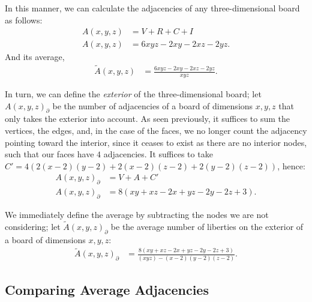 In this manner, we can calculate the adjacencies of any three-dimensional board as follows:
\begin{align*}
	A(x,y,z)&=V+R+C+I\\
	A(x,y,z)&=6 x y z - 2 x y - 2 x z - 2 y z.
\end{align*}    
And its average,
\begin{align*}
	\tilde{A}(x,y,z)&=\frac{6 x y z - 2 x y - 2 x z - 2 y z}{xyz}.
\end{align*}

In turn, we can define the \textit{exterior} of the three-dimensional board; let \(A(x,y,z)_{\partial}\) be the number of adjacencies of a board of dimensions \(x, y, z\) that only takes the exterior into account. As seen previously, it suffices to sum the vertices, the edges, and, in the case of the faces, we no longer count the adjacency pointing toward the interior, since it ceases to exist as there are no interior nodes, such that our faces have $4$ adjacencies. It suffices to take \(C'= 4(2(x-2)(y-2)+2(x-2)(z-2)+2(y-2)(z-2))\), hence:
\begin{align*}
	A(x,y,z)_{\partial}&=V+A+C'\\
	A(x,y,z)_{\partial}&=8 (x y + x z - 2 x + y z - 2 y - 2 z + 3).
\end{align*}

We immediately define the average by subtracting the nodes we are not considering; let \(\tilde{A}(x,y,z)_{\partial}\) be the average number of liberties on the exterior of a board of dimensions \(x, y, z\):
\begin{align*}
	\tilde{A}(x,y,z)_{\partial}&=\frac{8 (x y + x z - 2 x + y z - 2 y - 2 z + 3)}{(xyz)-(x-2)(y-2)(z-2)}.
\end{align*}
\subsection{Comparing Average Adjacencies}\label{key:libprom}

